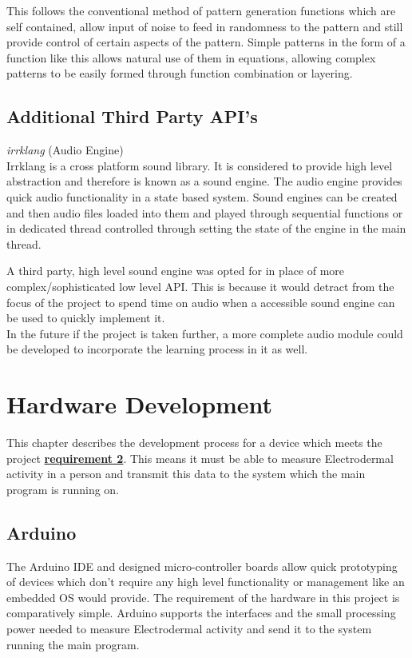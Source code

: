 \documentclass{report}
\begin{document}
This follows the conventional method of pattern generation functions which are self contained, allow input of noise to feed in randomness to the pattern and still provide control of certain aspects of the pattern.
Simple patterns in the form of a function like this allows natural use of them in equations, allowing complex patterns to be easily formed through function combination or layering.


\section{Additional Third Party API's}

\textit{irrklang} (Audio Engine)\\
Irrklang is a cross platform sound library. It is considered to provide high level abstraction and therefore is known as a sound engine.
The audio engine provides quick audio functionality in a state based system. Sound engines can be created and then audio files loaded into them and 
played through sequential functions or in dedicated thread controlled through setting the state of the engine in the main thread.

A third party, high level sound engine was opted for in place of more complex/sophisticated low level API. This is because it would detract from the focus of the project
to spend time on audio when a accessible sound engine can be used to quickly implement it.\\
In the future if the project is taken further, a more complete audio module could be developed to incorporate the learning process in it as well.

\chapter{Hardware Development}
This chapter describes the development process for a device which meets the project  \hyperlink{txt:r2}{\textbf{requirement 2}}. This means it must be able to measure Electrodermal
activity in a person and transmit this data to the system which the main program is running on.

\section{Arduino}
The Arduino IDE and designed micro-controller boards allow quick prototyping of devices which don't require any high level functionality or management
like an embedded OS would provide. The requirement of the hardware in this project is comparatively simple. Arduino supports the interfaces and the
small processing power needed to measure Electrodermal activity and send it to the system running the main program.
\end{document}

